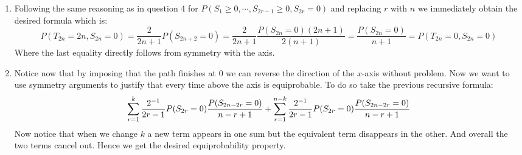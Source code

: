 \documentclass[10pt,a4paper]{article}
\begin{document}
\begin{enumerate}
\item Following the same reasoning as in question 4 for $P(S_1 \geq 0, \cdots, S_{2r - 1}\geq 0, S_{2r } = 0)$ and replacing $r$ with $n$ we immediately obtain the desired formula which is:
\[
P(T_{2n} = 2n, S_{2n} = 0) = \frac{2}{2n + 1} P(S_{2n + 2} = 0) = \frac{2}{2n + 1} \frac{P(S_{2n} = 0) (2 n + 1)}{2(n + 1)} = \frac{P(S_{2n} = 0)}{n + 1} = P(T_{2n} = 0, S_{2n} = 0)
\]
Where the last equality directly follows from symmetry with the axis.

\item Notice now that by imposing that the path finishes at 0 we can reverse the direction of the $x$-axis without problem. Now we want to use symmetry arguments to justify that every time above the axis is equiprobable. To do so take the previous recursive formula:
\[
\sum_{r = 1}^k \frac{2^{-1}}{2r - 1} P(S_{2r} = 0) \frac{P(S_{2n - 2r} = 0)}{n - r + 1} + \sum_{r = 1}^{n - k}\frac{2^{-1}}{2r - 1} P(S_{2r} = 0) \frac{P(S_{2n - 2r} = 0)}{n - r + 1}\\
\]
Now notice that when we change $k$ a new term appears in one sum but the equivalent term disappears in the other. And overall the two terms cancel out. Hence we get the desired equiprobability property.

\end{enumerate}
\end{document}
